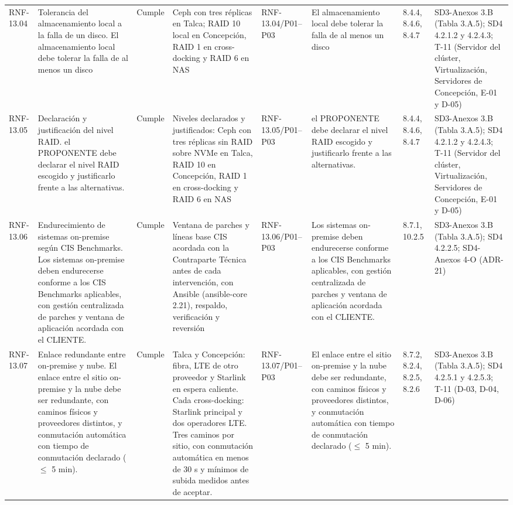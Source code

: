 \documentclass[oficio,firma,final]{lafrox}
\begin{document}
\begin{landscape}
{\begin{longtable}{@{}F{0.054} F{0.173} F{0.061} F{0.191} F{0.106} F{0.180} F{0.067} F{0.168}@{}}
  RNF-13.04 & Tolerancia del almacenamiento local a la falla de un disco. El almacenamiento local debe tolerar la falla de al menos un disco & Cumple & Ceph con tres réplicas en Talca; RAID 10 local en Concepción, RAID 1 en cross-docking y RAID 6 en NAS & RNF-13.04/\allowbreak{}P01--\allowbreak{}P03 & El almacenamiento local debe tolerar la falla de al menos un disco & 8.4.4, 8.4.6, 8.4.7 & SD3-Anexos 3.B (Tabla 3.A.5); SD4 4.2.1.2 y 4.2.4.3; T-11 (Servidor del clúster, Virtualización, Servidores de Concepción, E-01 y D-05)  \\
  RNF-13.05 & Declaración y justificación del nivel RAID. el PROPONENTE debe declarar el nivel RAID escogido y justificarlo frente a las alternativas. & Cumple & Niveles declarados y justificados: Ceph con tres réplicas sin RAID sobre NVMe en Talca, RAID 10 en Concepción, RAID 1 en cross-docking y RAID 6 en NAS & RNF-13.05/\allowbreak{}P01--\allowbreak{}P03 & el PROPONENTE debe declarar el nivel RAID escogido y justificarlo frente a las alternativas. & 8.4.4, 8.4.6, 8.4.7 & SD3-Anexos 3.B (Tabla 3.A.5); SD4 4.2.1.2 y 4.2.4.3; T-11 (Servidor del clúster, Virtualización, Servidores de Concepción, E-01 y D-05)  \\
  RNF-13.06 & Endurecimiento de sistemas on-premise según CIS Benchmarks. Los sistemas on-premise deben endurecerse conforme a los CIS Benchmarks aplicables, con gestión centralizada de parches y ventana de aplicación acordada con el CLIENTE. & Cumple & Ventana de parches y líneas base CIS acordada con la Contraparte Técnica antes de cada intervención, con Ansible (ansible-core 2.21), respaldo, verificación y reversión & RNF-13.06/\allowbreak{}P01--\allowbreak{}P03 & Los sistemas on-premise deben endurecerse conforme a los CIS Benchmarks aplicables, con gestión centralizada de parches y ventana de aplicación acordada con el CLIENTE. & 8.7.1, 10.2.5 & SD3-Anexos 3.B (Tabla 3.A.5); SD4 4.2.2.5; SD4-Anexos 4-O (ADR-21)  \\
  RNF-13.07 & Enlace redundante entre on-premise y nube. El enlace entre el sitio on-premise y la nube debe ser redundante, con caminos físicos y proveedores distintos, y conmutación automática con tiempo de conmutación declarado ($\leq$ 5 min). & Cumple & Talca y Concepción: fibra, LTE de otro proveedor y Starlink en espera caliente. Cada cross-docking: Starlink principal y dos operadores LTE. Tres caminos por sitio, con conmutación automática en menos de 30 s y mínimos de subida medidos antes de aceptar. & RNF-13.07/\allowbreak{}P01--\allowbreak{}P03 & El enlace entre el sitio on-premise y la nube debe ser redundante, con caminos físicos y proveedores distintos, y conmutación automática con tiempo de conmutación declarado ($\leq$ 5 min). & 8.7.2, 8.2.4, 8.2.5, 8.2.6 & SD3-Anexos 3.B (Tabla 3.A.5); SD4 4.2.5.1 y 4.2.5.3; T-11 (D-03, D-04, D-06)  \\

\end{longtable}}
\end{landscape}
\end{document}
